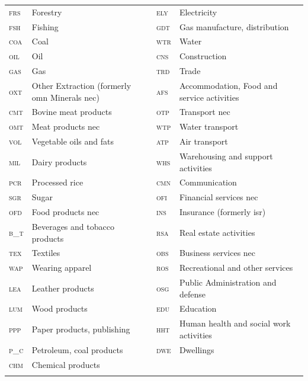\begin{table}[ht!]
\begin{center}
\begin{tabular}{llll}
\textsc{frs} & 	{Forestry}                                     & \textsc{ely} & 	{Electricity}\\
\textsc{fsh} & 	{Fishing}                                      & \textsc{gdt} & 	{Gas manufacture, distribution}\\
\textsc{coa} & 	{Coal}                                         & \textsc{wtr} & 	{Water}\\
\textsc{oil} & 	{Oil}                                          & \textsc{cns} & 	{Construction}\\
\textsc{gas} & 	{Gas}                                          & \textsc{trd} & 	{Trade}\\
\textsc{oxt} & 	{Other Extraction (formerly omn Minerals nec)} & \textsc{afs} & 	{Accommodation, Food and service activities}\\
\textsc{cmt} & 	{Bovine meat products}                         & \textsc{otp} & 	{Transport nec}\\
\textsc{omt} & 	{Meat products nec}                            & \textsc{wtp} & 	{Water transport}\\
\textsc{vol} & 	{Vegetable oils and fats}                      & \textsc{atp} & 	{Air transport}\\
\textsc{mil} & 	{Dairy products}                               & \textsc{whs} & 	{Warehousing and support activities}\\
\textsc{pcr} & 	{Processed rice}                               & \textsc{cmn} & 	{Communication}\\
\textsc{sgr} & 	{Sugar}                                        & \textsc{ofi} & 	{Financial services nec}\\
\textsc{ofd} & 	{Food products nec}                            & \textsc{ins} & 	{Insurance (formerly isr)}\\
\textsc{b\_t} &  {Beverages and tobacco products}              & \textsc{rsa} & 	{Real estate activities}\\
\textsc{tex} & 	{Textiles}                                     & \textsc{obs} & 	{Business services nec}\\
\textsc{wap} & 	{Wearing apparel}                              & \textsc{ros} & 	{Recreational and other services}\\
\textsc{lea} & 	{Leather products}                             & \textsc{osg} & 	{Public Administration and defense}\\
\textsc{lum} & 	{Wood products}                                & \textsc{edu} & 	{Education}\\
\textsc{ppp} & 	{Paper products, publishing}                   & \textsc{hht} & 	{Human health and social work activities}\\
\textsc{p\_c} &  {Petroleum, coal products}                    & \textsc{dwe} & 	{Dwellings}\\
\textsc{chm} & 	{Chemical products}                            & & \\
\addlinespace
\bottomrule
\end{tabular}
\end{center}
\end{table}

